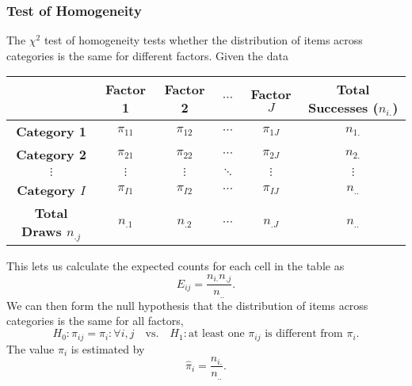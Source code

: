 \documentclass{article}
\begin{document}
\subsubsection{Test of Homogeneity}
The \(\chi^2\) test of homogeneity tests whether the distribution of
items across categories is the same for different factors. Given the
data
\begin{table}[H]
    \centering
    \begin{tabular}{c c c c c c}
        \toprule
                                        & \textbf{Factor 1} & \textbf{Factor 2} & \(\cdots\) & \textbf{Factor \(J\)} & \textbf{Total Successes (\(n_{i.}\))} \\
        \midrule
        \textbf{Category 1}             & \(\pi_{11}\)      & \(\pi_{12}\)      & \(\cdots\) & \(\pi_{1J}\)          & \(n_{1.}\)                            \\
        \textbf{Category 2}             & \(\pi_{21}\)      & \(\pi_{22}\)      & \(\cdots\) & \(\pi_{2J}\)          & \(n_{2.}\)                            \\
        \(\vdots\)                      & \(\vdots\)        & \(\vdots\)        & \(\ddots\) & \(\vdots\)            & \(\vdots\)                            \\
        \textbf{Category \(I\)}         & \(\pi_{I1}\)      & \(\pi_{I2}\)      & \(\cdots\) & \(\pi_{IJ}\)          & \(n_{..}\)                            \\
        \textbf{Total Draws \(n_{.j}\)} & \(n_{.1}\)        & \(n_{.2}\)        & \(\cdots\) & \(n_{.J}\)            & \(n_{..}\)                            \\
        \bottomrule
    \end{tabular}
\end{table}
This lets us calculate the expected counts for each cell in the table as
\begin{equation*}
    E_{ij} = \frac{n_{i.} n_{.j}}{n_{..}}.
\end{equation*}
We can then form the null hypothesis that the distribution of items across categories is the same for all factors,
\begin{equation*}
    H_0: \pi_{ij} = \pi_{i} : \forall i, j \quad \text{vs.} \quad H_1: \text{at least one \(\pi_{ij}\) is different from \(\pi_{i}\)}.
\end{equation*}
The value \(\pi_i\) is estimated by
\begin{equation*}
    \hat{\pi}_i = \frac{n_{i.}}{n_{..}}.
\end{equation*}
\end{document}
